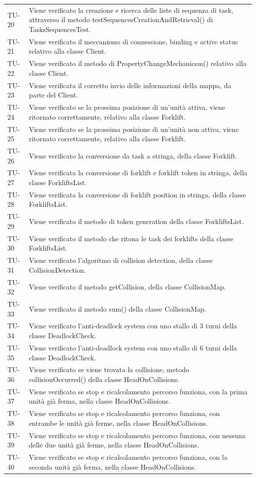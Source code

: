\begin{longtable}{ >{\centering}p{} >{}p{}}
	TU-20 & Viene verificato la creazione e ricerca delle liste di sequenza di task, attraverso il metodo testSequencesCreationAndRetrieval() di TasksSequencesTest. \tabularnewline
	TU-21 & Viene verificato il meccanismo di connessione, binding e active status relativo alla classe Client. \tabularnewline
	TU-22 & Viene verificato il metodo di PropertyChangeMechanicsm() relativo alla classe Client. \tabularnewline
	TU-23 & Viene verificata il corretto invio delle informazioni della mappa, da parte del Client. \tabularnewline
	TU-24 & Viene verificato se la prossima posizione di un'unità attiva, viene ritornato correttamente, relativo alla classe Forklift. \tabularnewline
	TU-25 & Viene verificato se la prossima posizione di un'unità non attiva, viene ritornato correttamente, relativo alla classe Forklift. \tabularnewline
	TU-26 & Viene verificato la conversione da task a stringa, della classe Forklift. \tabularnewline
	TU-27 & Viene verificata la conversione di forklift e forklift token in stringa, della classe ForkliftsList. \tabularnewline
	TU-28 & Viene verificata la conversione di forklift position in stringa, della classe ForkliftsList. \tabularnewline
	TU-29 & Viene verificato il metodo di token generation della classe ForkliftsList. \tabularnewline
	TU-30 & Viene verificato il metodo che ritona le task dei forklifts della classe ForkliftsList. \tabularnewline
	TU-31 & Viene verificato l'algoritmo di collision detection, della classe CollisionDetection. \tabularnewline
	TU-32 & Viene verificato il metodo getCollision, della classe CollisionMap. \tabularnewline
	TU-33 & Viene verificato il metodo sum() della classe CollisionMap. \tabularnewline
	TU-34 & Viene verificato l'anti-deadlock system con uno stallo di 3 turni della classe DeadlockCheck. \tabularnewline
	TU-35 & Viene verificato l'anti-deadlock system con uno stallo di 6 turni della classe DeadlockCheck. \tabularnewline
	TU-36 & Viene verificato se viene trovata la collisione, metodo collisionOccurred() della classe HeadOnCollisions. \tabularnewline
	TU-37 & Viene verificato se stop e ricalcolamento percorso funziona, con la prima unità già ferma, nella classe HeadOnCollisions. \tabularnewline
	TU-38 & Viene verificato se stop e ricalcolamento percorso funziona, con entrambe le unità già ferme, nella classe HeadOnCollisions. \tabularnewline
	TU-39 & Viene verificato se stop e ricalcolamento percorso funziona, con nessuna delle due unità già ferme, nella classe HeadOnCollisions. \tabularnewline
	TU-40 & Viene verificato se stop e ricalcolamento percorso funziona, con la seconda unità già ferma, nella classe HeadOnCollisions. \tabularnewline

\end{longtable}
